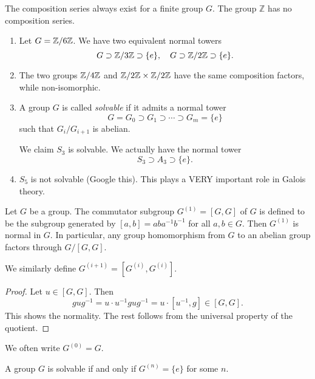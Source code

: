 \begin{remark}
    The composition series always exist for a finite group $G$. The group $\mathbb{Z}$ has no composition series.
\end{remark}
\begin{example}
    \begin{enumerate}
        \item Let $G= \mathbb {Z}/6\mathbb {Z}$. We have two equivalent normal towers
              \[
                  G \supset \mathbb {Z}/3\mathbb {Z} \supset \{e\}, \quad G \supset \mathbb {Z}/2\mathbb {Z} \supset \{e\}.
              \]
        \item The two groups $\mathbb{Z}/4\mathbb{Z}$ and $\mathbb{Z}/2\mathbb{Z} \times \mathbb{Z}/2\mathbb{Z}$ have the same composition factors, while non-isomorphic.
        \item
              A group $G$ is called {\em solvable} if it admits a normal tower
              \[
                  G = G_0 \supset G_1 \supset \cdots \supset G_m = \{e\}
              \]
              such that $G_{i}/G_{i+1}$ is abelian.

              We claim $S_3$ is solvable. We actually have the normal tower
              \[
                  S_3 \supset A_3 \supset \{e\}.
              \]
        \item $S_5$ is not solvable (Google this). This plays a VERY important role in Galois theory.
    \end{enumerate}
\end{example}



\begin{lem}
    Let $G$ be a group. The commutator subgroup $G^{(1)} = [G, G]$ of $G$ is defined to be the subgroup generated by $[a,b]= aba^{-1}b^{-1}$ for all $a, b \in G$. Then $G^{(1)}$ is normal in $G$. In particular, any group homomorphism from $G$ to an abelian group factors through $G/ [G, G]$.


    We similarly define $G^{(i+1)} = [G^{(i)}, G^{(i)}]$.
\end{lem}

\begin{proof}
    Let $u \in [G, G]$. Then
    \[
        gug^{-1} = u \cdot u^{-1} gug^{-1}  = u \cdot [u^{-1}, g] \in[G, G].
    \]
    This shows the normality.  The rest follows from the universal property of the quotient.
\end{proof}
We often write $G^{(0)} = G$.

\begin{prop}
    A group $G$ is solvable if and only if $G^{(n)} = \{e\}$ for some $n$.
\end{prop}

